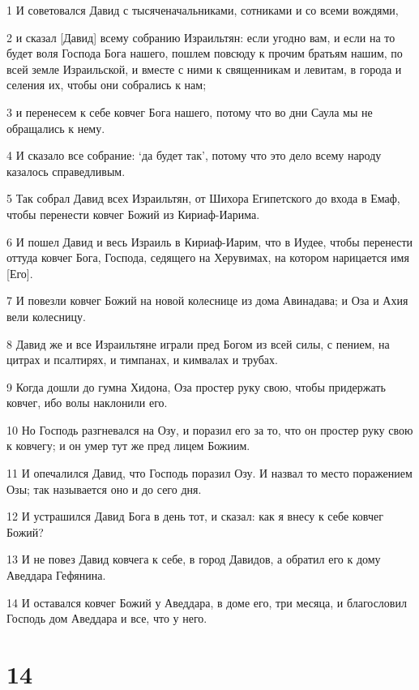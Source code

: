 \par 1 И советовался Давид с тысяченачальниками, сотниками и со всеми вождями,
\par 2 и сказал [Давид] всему собранию Израильтян: если угодно вам, и если на то будет воля Господа Бога нашего, пошлем повсюду к прочим братьям нашим, по всей земле Израильской, и вместе с ними к священникам и левитам, в города и селения их, чтобы они собрались к нам;
\par 3 и перенесем к себе ковчег Бога нашего, потому что во дни Саула мы не обращались к нему.
\par 4 И сказало все собрание: `да будет так', потому что это дело всему народу казалось справедливым.
\par 5 Так собрал Давид всех Израильтян, от Шихора Египетского до входа в Емаф, чтобы перенести ковчег Божий из Кириаф-Иарима.
\par 6 И пошел Давид и весь Израиль в Кириаф-Иарим, что в Иудее, чтобы перенести оттуда ковчег Бога, Господа, седящего на Херувимах, на котором нарицается имя [Его].
\par 7 И повезли ковчег Божий на новой колеснице из дома Авинадава; и Оза и Ахия вели колесницу.
\par 8 Давид же и все Израильтяне играли пред Богом из всей силы, с пением, на цитрах и псалтирях, и тимпанах, и кимвалах и трубах.
\par 9 Когда дошли до гумна Хидона, Оза простер руку свою, чтобы придержать ковчег, ибо волы наклонили его.
\par 10 Но Господь разгневался на Озу, и поразил его за то, что он простер руку свою к ковчегу; и он умер тут же пред лицем Божиим.
\par 11 И опечалился Давид, что Господь поразил Озу. И назвал то место поражением Озы; так называется оно и до сего дня.
\par 12 И устрашился Давид Бога в день тот, и сказал: как я внесу к себе ковчег Божий?
\par 13 И не повез Давид ковчега к себе, в город Давидов, а обратил его к дому Аведдара Гефянина.
\par 14 И оставался ковчег Божий у Аведдара, в доме его, три месяца, и благословил Господь дом Аведдара и все, что у него.

\chapter{14}

